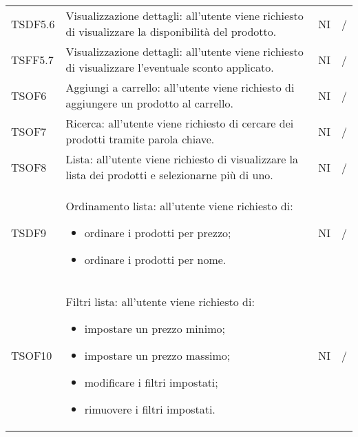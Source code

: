 \begin{center}
\begin{longtable}[!h]{p{60px} p{240px} p{35px} p{35px}}
        TSDF5.6                          & Visualizzazione dettagli: all'utente viene richiesto di visualizzare la disponibilità del prodotto.                                                                 & NI             & /             \\
        TSFF5.7                          & Visualizzazione dettagli: all'utente viene richiesto di visualizzare l'eventuale sconto applicato.                                                                  & NI             & /             \\
        TSOF6                            & Aggiungi a carrello: all'utente viene richiesto di aggiungere un prodotto al carrello.                                                                              & NI             & /             \\
        TSOF7                            & Ricerca: all'utente viene richiesto di cercare dei prodotti tramite parola chiave.                                                                                  & NI             & /             \\
        TSOF8                            & Lista: all'utente viene richiesto di visualizzare la lista dei prodotti e selezionarne pi\`u di uno.                                                                & NI             & /             \\
        TSDF9                            & Ordinamento lista: all'utente viene richiesto di: \begin{itemize} \item ordinare i prodotti per prezzo; \item ordinare i prodotti per nome. \end{itemize}                                                                                         & NI             & /             \\
        TSOF10                           & Filtri lista: all'utente viene richiesto di: \begin{itemize} \item impostare un prezzo minimo; \item impostare un prezzo massimo; \item modificare i filtri impostati; \item rimuovere i filtri impostati. \end{itemize}                                                                                             & NI             & /             \\

\end{longtable}
\end{center}
